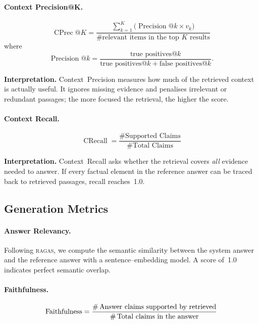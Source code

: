 \documentclass[conference]{IEEEtran}
\begin{document}
\paragraph{Context Precision@K.}
\begin{equation}
  \operatorname{CPrec}@K =
  \frac{\displaystyle\sum_{k=1}^{K}\bigl(\operatorname{Precision}@k \times v_k\bigr)}
       {\text{\# relevant items in the top } K \text{ results}}
  \label{eq:cprec}
\end{equation}
where
\begin{equation}
  \operatorname{Precision}@k=
  \frac{\text{true positives}@k}
       {\text{true positives}@k+\text{false positives}@k}.
  \label{eq:precatk}
\end{equation}

\textbf{Interpretation.}  Context~Precision measures how much of the retrieved
context is actually useful.  It ignores missing evidence and penalises
irrelevant or redundant passages; the more focused the retrieval, the higher
the score.

\paragraph{Context Recall.}
\begin{equation}
  \operatorname{CRecall}=
  \frac{\text{\# Supported Claims}}{\text{\# Total Claims}}
  \label{eq:crecall}
\end{equation}

\textbf{Interpretation.}  Context~Recall asks whether the retrieval covers
\emph{all} evidence needed to answer.  If every factual element in the reference
answer can be traced back to retrieved passages, recall reaches~1.0.

\subsection{Generation Metrics}

\paragraph{Answer Relevancy.}
Following \textsc{ragas}, we compute the semantic similarity between the system
answer and the reference answer with a sentence–embedding model.
A score of~1.0 indicates perfect semantic overlap.

\paragraph{Faithfulness.}
\begin{equation}
    \text{Faithfulness} =
    \frac{\text{\#\,Answer claims supported by retrieved}}
    {\text{\#\,Total claims in the answer}}
\end{equation}
\end{document}
